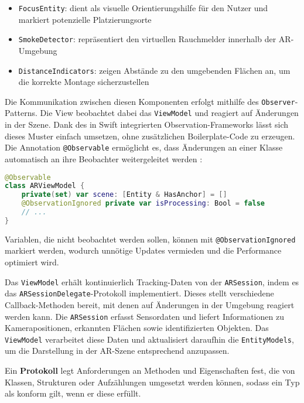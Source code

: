 \begin{itemize}
    \item \texttt{FocusEntity}: dient als visuelle Orientierungshilfe für den Nutzer und markiert potenzielle Platzierungsorte
    \item \texttt{SmokeDetector}: repräsentiert den virtuellen Rauchmelder innerhalb der AR-Umgebung
    \item \texttt{DistanceIndicators}: zeigen Abstände zu den umgebenden Flächen an, um die korrekte Montage sicherzustellen
\end{itemize}

Die Kommunikation zwischen diesen Komponenten erfolgt mithilfe des \texttt{Observer}-Patterns. Die View beobachtet dabei das \texttt{ViewModel} und reagiert auf Änderungen in der Szene. Dank des in Swift integrierten Observation-Frameworks lässt sich dieses Muster einfach umsetzen, ohne zusätzlichen Boilerplate-Code zu erzeugen. Die Annotation \texttt{@Observable} ermöglicht es, dass Änderungen an einer Klasse automatisch an ihre Beobachter weitergeleitet werden \cite{appledevdoc}:

\begin{lstlisting}[language=Swift]
@Observable
class ARViewModel {
    private(set) var scene: [Entity & HasAnchor] = []
    @ObservationIgnored private var isProcessing: Bool = false
    // ...
}
\end{lstlisting}

Variablen, die nicht beobachtet werden sollen, können mit \texttt{@ObservationIgnored} markiert werden, wodurch unnötige Updates vermieden und die Performance optimiert wird. \cite{appledevdoc}

Das \texttt{ViewModel} erhält kontinuierlich Tracking-Daten von der \texttt{ARSession}, indem es das \linebreak\texttt{ARSessionDelegate}-Protokoll implementiert. Dieses stellt verschiedene Callback-Methoden bereit, mit denen auf Änderungen in der Umgebung reagiert werden kann. Die \texttt{ARSession} erfasst Sensordaten und liefert Informationen zu Kamerapositionen, erkannten Flächen sowie identifizierten Objekten. Das \texttt{ViewModel} verarbeitet diese Daten und aktualisiert daraufhin die \texttt{EntityModels}, um die Darstellung in der AR-Szene entsprechend anzupassen. \cite{appledevdoc}

\begin{tcolorbox}[colback=THAi-Blue!20!white, colframe=THAi-Blue]
    Ein \textbf{Protokoll} legt Anforderungen an Methoden und Eigenschaften fest, die von Klassen, Strukturen oder Aufzählungen umgesetzt werden können, sodass ein Typ als konform gilt, wenn er diese erfüllt. \cite{apple2025swift}
\end{tcolorbox}  

